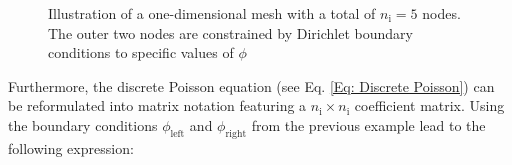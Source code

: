 \begin{figure}[H]
    \centering
    \caption{Illustration of a one-dimensional mesh with a total of $n_\mathrm{i}=5$ nodes. The outer two nodes are constrained by Dirichlet boundary conditions to specific values of $\phi$}
    \label{fig:points}
\end{figure}

Furthermore, the discrete Poisson equation (see Eq. \ref{Eq: Discrete Poisson})  can be reformulated into matrix notation featuring a $n_\mathrm{i} \times n_\mathrm{i}$ coefficient matrix. Using the boundary conditions $\phi_\mathrm{left}$ and $\phi_\mathrm{right}$ from the previous example lead to the following expression:


